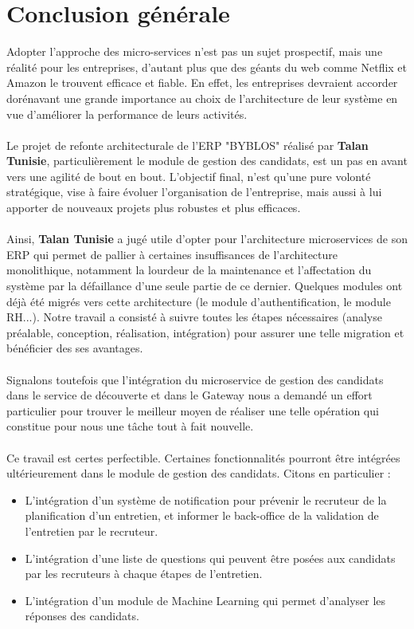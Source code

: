 \chapter*{Conclusion générale}
Adopter l'approche des micro-services n'est pas un sujet prospectif, mais une réalité pour les entreprises, d'autant plus que des géants du web comme Netﬂix et Amazon le trouvent eﬃcace et ﬁable. En effet, les entreprises devraient accorder dorénavant une grande importance au choix de l'architecture de leur système en vue d'améliorer la performance de leurs activités.\\ \\
Le projet de refonte architecturale de l'ERP "BYBLOS" réalisé par \textbf{Talan Tunisie}, particulièrement le module de gestion des candidats, est un pas en avant vers une agilité de bout en bout. L'objectif final, n'est qu'une pure volonté stratégique, vise à faire évoluer l'organisation de l'entreprise, mais aussi à lui apporter de nouveaux projets plus robustes et plus efficaces.\\ \\
Ainsi, \textbf{Talan Tunisie} a jugé utile d'opter pour l'architecture microservices de son ERP qui permet de pallier à certaines insuffisances de l'architecture monolithique, notamment la lourdeur de la maintenance et l'affectation du système par la défaillance d'une seule partie de ce dernier. Quelques modules ont déjà été migrés vers cette architecture (le module d'authentification, le module RH...). Notre travail a consisté à suivre toutes les étapes nécessaires (analyse préalable, conception, réalisation, intégration) pour assurer une telle migration et bénéficier des ses avantages.\\ \\ 
Signalons toutefois que l'intégration du microservice de gestion des candidats dans le service de découverte et dans le Gateway nous a demandé un effort particulier pour trouver le meilleur moyen de réaliser une telle opération qui constitue pour nous une tâche tout à fait nouvelle.\\ \\
Ce travail est certes perfectible. Certaines fonctionnalités pourront être intégrées ultérieurement dans le module de gestion des candidats. Citons en particulier : 
\begin{itemize}
    \item L'intégration d'un système de notification pour prévenir le recruteur de la planification d'un entretien, et informer le back-office de la validation de l'entretien par le recruteur.
    \item L'intégration d'une liste de questions qui peuvent être posées aux candidats par les recruteurs à chaque étapes de l'entretien.
    \item L'intégration d'un module de Machine Learning qui permet d'analyser les réponses des candidats. 
\end{itemize}
 



